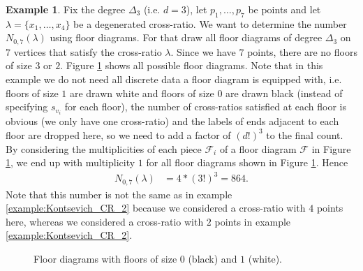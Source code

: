 \documentclass[11pt,reqno,a4]{amsart}
\theoremstyle{dotless}
\theoremstyle{definition}
\newtheorem{example}[corollary]{Example}
\begin{document}
\begin{example}
Fix the degree $\Delta_3$ (i.e. $d=3$), let $p_1,\dots,p_7$ be points and let $\lambda=\lbrace x_1,\dots,x_4\rbrace$ be a degenerated cross-ratio. We want to determine the number $N_{0,7}\left(\lambda\right)$ using floor diagrams. For that draw all floor diagrams of degree $\Delta_3$ on $7$ vertices that satisfy the cross-ratio $\lambda$. Since we have $7$ points, there are no floors of size $3$ or $2$. Figure \ref{Example_complete_flor_diagram} shows all possible floor diagrams. Note that in this example we do not need all discrete data a floor diagram is equipped with, i.e. floors of size $1$ are drawn white and floors of size $0$ are drawn black (instead of specifying $s_{v_i}$ for each floor), the number of cross-ratios satisfied at each floor is obvious (we only have one cross-ratio) and the labels of ends adjacent to each floor are dropped here, so we need to add a factor of $(d!)^3$ to the final count. By considering the multiplicities of each piece $\mathcal{F}_i$ of a floor diagram $\mathcal{F}$ in Figure \ref{Example_complete_flor_diagram}, we end up with multiplicity $1$ for all floor diagrams shown in Figure \ref{Example_complete_flor_diagram}. Hence 
\begin{align*}
N_{0,7}\left(\lambda\right)&=4*(3!)^3=864.
\end{align*}
Note that this number is not the same as in example \ref{example:Kontsevich_CR_2} because we considered a cross-ratio with $4$ points here, whereas we considered a cross-ratio with $2$ points in example \ref{example:Kontsevich_CR_2}.

\begin{figure}[H]
\centering
\def\svgwidth{230pt}

\caption{Floor diagrams with floors of size $0$ (black) and $1$ (white).}
\label{Example_complete_flor_diagram}
\end{figure}

\end{example}









\end{document}
